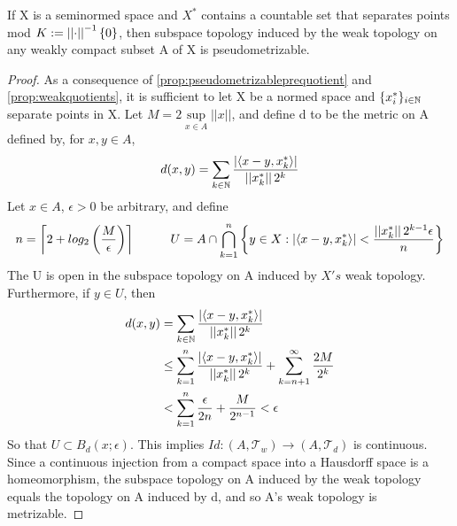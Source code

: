 \begin{lem}
    \label{lem:metrizableweak}
    If X is a seminormed space and $X^*$ contains a countable set that separates points mod $K:=\norm{\cdot}^{-1}\{0\}$,
    then subspace topology induced by the weak topology on any weakly compact subset A of X is pseudometrizable. 
    \begin{proof}
        As a consequence of \ref{prop:pseudometrizableprequotient} and \ref{prop:weakquotients}, it is sufficient to let X be a normed space and $\{x_i^*\}_{i \in \N}$ separate points in X. 
        Let $M=2\sup\limits_{x \in A} ||x||$, and define d to be the metric on A defined by, for $x,y \in A$, 
        \begin{equation}
            d(x,y) = \sum_{k \in \N} \frac{\abs{\ip{x-y,x_k^*}}}{\norm{x_k^*} 2^k}
        \end{equation}
        Let $x \in A$, $\epsilon > 0$ be arbitrary, and define 
        \begin{equation}
            n=\ceil{2+log_2\pa{\frac{M}{\epsilon}}} \tab[1cm] U=A \cap \bigcap_{k=1}^n
            \left\{y \in X : \abs{\ip{x-y,x_k^*}} < \frac{\norm{x_k^*}2^{k-1}\epsilon}{n}\right\}
        \end{equation}
        The U is open in the subspace topology on A induced by $X's$ weak topology. Furthermore, if $y \in U$, then 
        \begin{equation}
            \begin{split}
                d(x,y) &= \sum_{k \in \N} \frac{\abs{\ip{x-y,x_k^*}}}{\norm{x_k^*}2^k} \\
                & \leq \sum_{k=1}^n \frac{\abs{\ip{x-y,x_k^*}}}{\norm{x_k^*}2^k} + \sum_{k=n+1}^\infty \frac{2M}{2^k}\\
                & < \sum_{k=1}^n \frac{\epsilon}{2n}+ \frac{M}{2^{n-1}}< \epsilon
            \end{split} 
        \end{equation}
        So that $U \subset B_d(x;\epsilon)$. 
        This implies $Id:(A,\mathcal{T}_w) \to (A,\mathcal{T}_d)$ is continuous. 
        Since a continuous injection from a compact space into a Hausdorff space is a homeomorphism, the subspace topology on A induced by the weak topology equals the topology on A induced by d, and so A's weak topology is metrizable. 
    \end{proof} 
\end{lem}
